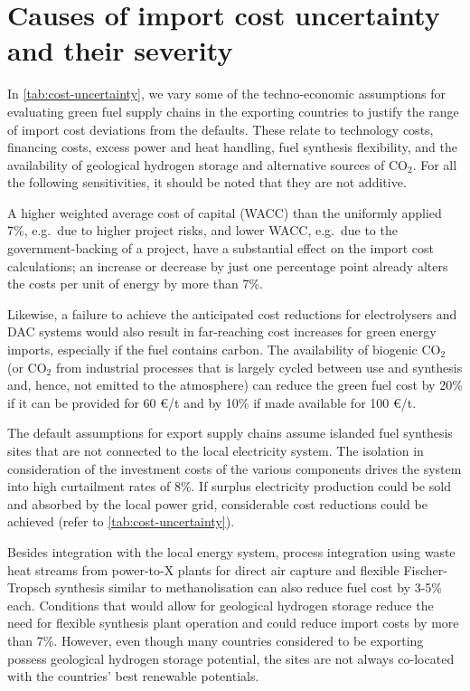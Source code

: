
\section*{Causes of import cost uncertainty and their severity}

In \cref{tab:cost-uncertainty}, we vary some of the techno-economic assumptions
for evaluating green fuel supply chains in the exporting countries to justify
the range of import cost deviations from the defaults. These relate to
technology costs, financing costs, excess power and heat handling, fuel
synthesis flexibility, and the availability of geological hydrogen storage and
alternative sources of CO$_2$. For all the following sensitivities, it should be
noted that they are not additive.

A higher weighted average cost of capital (WACC) than the uniformly applied 7\%,
e.g.~due to higher project risks, and lower WACC, e.g.~due to the
government-backing of a project, have a substantial effect on the import cost
calculations; an increase or decrease by just one percentage point already
alters the costs per unit of energy by more than
7\%.\cite{egliBiasEnergy2019,bogdanovReplyBias2019,lonerganImprovingRepresentation2023a,schyskaHowRegional2020,steffenDeterminantsCost2022}

Likewise, a failure to achieve the anticipated cost reductions for electrolysers
and DAC systems would also result in far-reaching cost increases for green
energy imports, especially if the fuel contains carbon. The availability of
biogenic CO$_2$ (or CO$_2$ from industrial processes that is largely cycled
between use and synthesis and, hence, not emitted to the atmosphere) can reduce
the green fuel cost by 20\% if it can be provided for 60 \euro{}/t and by 10\%
if made available for 100 \euro{}/t.

The default assumptions for export supply chains assume islanded fuel synthesis
sites that are not connected to the local electricity system. The isolation in
consideration of the investment costs of the various components drives the
system into high curtailment rates of 8\%. If surplus electricity production
could be sold and absorbed by the local power grid, considerable cost reductions
could be achieved (refer to \cref{tab:cost-uncertainty}). 

Besides integration with the local energy system, process integration using
waste heat streams from power-to-X plants for direct air capture and flexible
Fischer-Tropsch synthesis similar to methanolisation can also reduce fuel cost
by 3-5\% each. Conditions that would allow for geological hydrogen storage
reduce the need for flexible synthesis plant operation and could reduce import
costs by more than 7\%. However, even though many countries considered to be
exporting possess geological hydrogen storage potential, the sites are not
always co-located with the countries' best renewable potentials.
\cite{hevinUndergroundStorage2019}


